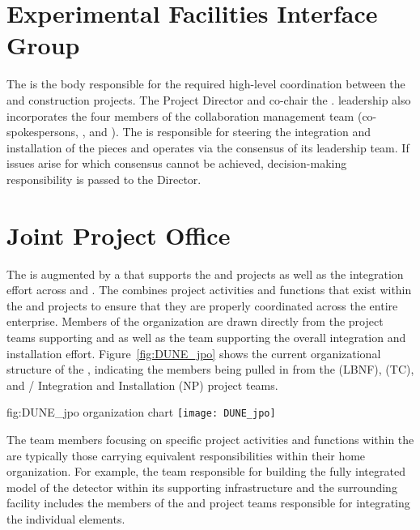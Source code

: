 \section{Experimental Facilities Interface Group}
\label{sec:efig}

The  is the body responsible for the required high-level
coordination between the  and  construction 
projects.  The  Project Director and  
co-chair the .   leadership also incorporates 
the four members of the  collaboration management 
team (co-spokespersons, , and ).  
The  is responsible for steering the integration and 
installation of the  pieces and operates via the 
consensus of its leadership team.  If issues arise for which consensus 
cannot be achieved, decision-making responsibility is passed to the 
 Director.

\section{Joint Project Office}
\label{sec:jpo}

The  is augmented by a  that supports the
 and  projects as well as the integration
effort across  and . The  
combines project activities and functions that exist within the 
 and  projects to ensure that they are 
properly coordinated across the entire enterprise.  Members of 
the  organization are drawn directly from the project 
teams supporting  and  as well as the 
team supporting the overall integration and installation effort.  
Figure~\ref{fig:DUNE_jpo} shows the current organizational 
structure of the , indicating the members being 
pulled in from the  (LBNF),  (TC), and 
/ Integration and Installation (NP) 
project teams.
\begin{dunefigure}{fig:DUNE_jpo}
  { organization chart}
  \texttt{[image: DUNE\_jpo]}
\end{dunefigure}
The team members focusing on specific project activities and 
functions within the  are typically those carrying 
equivalent responsibilities within their home organization.  For 
example, the  team responsible for building the fully 
integrated model of the detector within its supporting 
infrastructure and the surrounding facility includes the members 
of the  and  project teams responsible 
for integrating the individual elements.

